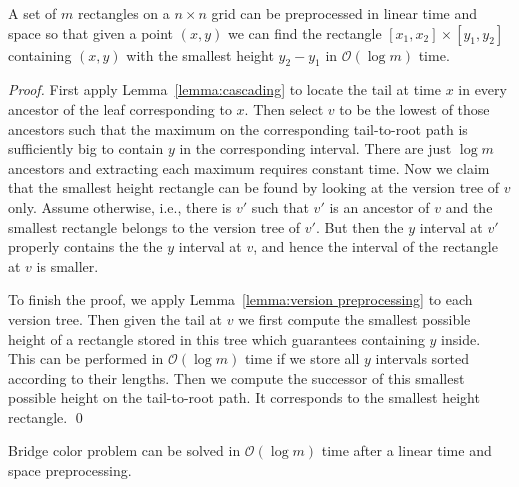 \documentclass[runningheads]{llncs}
\begin{document}
\begin{lemma}\label{lemma:smallest}
A set of $m$ rectangles on a $n\times n$ grid can be preprocessed in linear time and space so that given a point $(x,y)$ we can find the rectangle $[x_{1},x_{2}]\times[y_{1},y_{2}]$ containing $(x,y)$ with the smallest height $y_{2}-y_{1}$ in $\mathcal{O}(\log m)$ time.
\end{lemma}

\begin{proof}
First apply Lemma~\ref{lemma:cascading} to locate the tail at time $x$ in every ancestor of the leaf corresponding to $x$. Then select $v$ to be the lowest of those ancestors such that the maximum on the corresponding tail-to-root path is sufficiently big to contain $y$ in the corresponding interval. There are just $\log m$ ancestors and extracting each maximum requires constant time. Now we claim that the smallest height rectangle can be found by looking at the version tree of $v$ only.  Assume otherwise, i.e., there is $v'$ such that $v'$ is an ancestor of $v$ and the smallest rectangle belongs to the version tree of $v'$. But then the $y$ interval at $v'$ properly contains the the $y$ interval at $v$, and hence the interval of the rectangle at $v$ is smaller.

To finish the proof, we apply Lemma~\ref{lemma:version preprocessing} to each version tree. Then given the tail at $v$ we first compute the smallest possible height of a rectangle stored in this tree which guarantees containing $y$ inside. This can be performed in $\mathcal{O}(\log m)$ time if we store all $y$ intervals sorted according to their lengths. Then we compute the successor of this smallest possible height on the tail-to-root path. It corresponds to the smallest height rectangle.
\qed
\end{proof}

\begin{theorem}
Bridge color problem can be solved in $\mathcal{O}(\log m)$ time after a linear time and space preprocessing.
\end{theorem}
\end{document}
